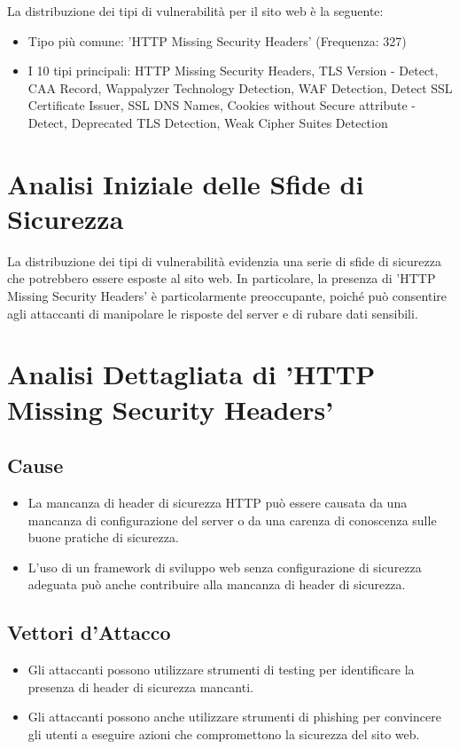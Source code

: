 La distribuzione dei tipi di vulnerabilità per il sito web è la seguente:
\begin{itemize}
\item Tipo più comune: 'HTTP Missing Security Headers' (Frequenza: 327)
\item I 10 tipi principali: HTTP Missing Security Headers, TLS Version - Detect, CAA Record, Wappalyzer Technology Detection, WAF Detection, Detect SSL Certificate Issuer, SSL DNS Names, Cookies without Secure attribute - Detect, Deprecated TLS Detection, Weak Cipher Suites Detection
\end{itemize}
\section{Analisi Iniziale delle Sfide di Sicurezza}

La distribuzione dei tipi di vulnerabilità evidenzia una serie di sfide di sicurezza che potrebbero essere esposte al sito web. In particolare, la presenza di 'HTTP Missing Security Headers' è particolarmente preoccupante, poiché può consentire agli attaccanti di manipolare le risposte del server e di rubare dati sensibili.

\section{Analisi Dettagliata di 'HTTP Missing Security Headers'}

\subsection{Cause}
\begin{itemize}
\item La mancanza di header di sicurezza HTTP può essere causata da una mancanza di configurazione del server o da una carenza di conoscenza sulle buone pratiche di sicurezza.
\item L'uso di un framework di sviluppo web senza configurazione di sicurezza adeguata può anche contribuire alla mancanza di header di sicurezza.
\end{itemize}
\subsection{Vettori d'Attacco}
\begin{itemize}
\item Gli attaccanti possono utilizzare strumenti di testing per identificare la presenza di header di sicurezza mancanti.
\item Gli attaccanti possono anche utilizzare strumenti di phishing per convincere gli utenti a eseguire azioni che compromettono la sicurezza del sito web.
\end{itemize}
